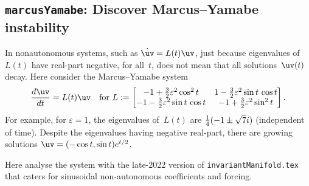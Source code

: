 \subsection{\texttt{marcusYamabe}: Discover Marcus--Yamabe instability}
\label{marcusYamabe}

In {nonautonomous} systems, such as \(\dot{\uv}=L(t)\uv\),
just because eigenvalues of~\(L(t)\) have real-part
negative, for all~\(t\), does not mean that all
solutions~\(\uv(t)\) decay. Here consider the
{Marcus--Yamabe system} \cite[p.197]{Chicone2006}
\begin{equation}\label{eq:oscmyi}
\de t{\uv}=L(t)\uv \quad\text{for }L:=\begin{bmatrix} 
-1+\rat32\varepsilon^2\cos^2 t & 1-\rat32\varepsilon^2\sin t\,\cos t\\
-1-\rat32\varepsilon^2\sin t\,\cos t&-1+\rat32\varepsilon^2\sin^2t
\end{bmatrix}.
\end{equation}
For example, for \(\varepsilon=1\), the eigenvalues
of~\(L(t)\) are \({\tfrac{1}{4}}(-1\pm\sqrt7i)\) (independent of
time). Despite the eigenvalues having negative real-part,
there are growing solutions \(\uv=(-\cos t,\sin t)e^{t/2}\).

Here analyse the system with the late-2022 version of
\verb|invariantManifold.tex| that caters for sinusoidal
non-autonomous coefficients and forcing.   

